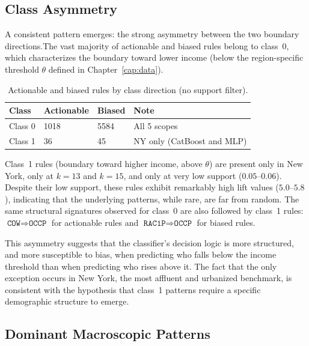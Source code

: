 \subsection{Class Asymmetry}

A consistent pattern emerges: the strong asymmetry between the two boundary directions.The vast majority of actionable and biased rules belong to class~0, which characterizes the boundary toward lower income (below the region-specific threshold $\theta$ defined in Chapter~\ref{cap:data}).

\begin{table}[htbp]
\centering
\renewcommand{\arraystretch}{1.2}
\caption{Actionable and biased rules by class direction (no support filter).}
\label{tab:class-asymmetry}
\begin{tabular}{>{\raggedright\arraybackslash}p{} p{} p{} p{}}
  \toprule
  \textbf{Class} & \textbf{Actionable} & \textbf{Biased} & \textbf{Note} \\
  \midrule
  Class 0 & 1018 & 5584 & All 5 scopes \\
  Class 1 & 36 & 45 & NY only (CatBoost and MLP) \\
  \bottomrule
\end{tabular}
\renewcommand{\arraystretch}{1.0}
\end{table}

Class~1 rules (boundary toward higher income, above $\theta$) are present only in New York, only at $k = 13$ and $k = 15$, and only at very low support ($0.05$--$0.06$). Despite their low support, these rules exhibit remarkably high lift values ($5.0$--$5.8$), indicating that the underlying patterns, while rare, are far from random. The same structural signatures observed for class~0 are also followed by class~1 rules: $\texttt{COW} \Rightarrow \texttt{OCCP}$ for actionable rules and $\texttt{RAC1P} \Rightarrow \texttt{OCCP}$ for biased rules.

This asymmetry suggests that the classifier's decision logic is more structured, and more susceptible to bias, when predicting who falls below the income threshold than when predicting who rises above it. The fact that the only exception occurs in New York, the most affluent and urbanized benchmark, is consistent with the hypothesis that class~1 patterns require a specific demographic structure to emerge.

\subsection{Dominant Macroscopic Patterns}

